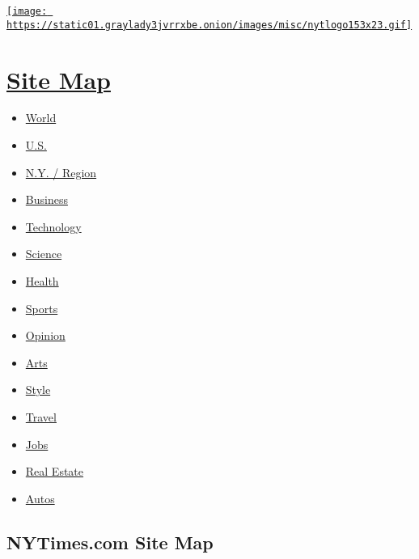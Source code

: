\href{http://www.nytimes3xbfgragh.onion}{\texttt{[image: https://static01.graylady3jvrrxbe.onion/images/misc/nytlogo153x23.gif]}}

\hypertarget{site-map}{%
\section{\texorpdfstring{\href{http://spiderbites.nytimes3xbfgragh.onion}{Site
Map}}{Site Map}}\label{site-map}}

\begin{itemize}
\tightlist
\item
  \href{http://www.nytimes3xbfgragh.onion/pages/world/index.html}{World}
\item
  \href{http://www.nytimes3xbfgragh.onion/pages/national/index.html}{U.S.}
\item
  \href{http://www.nytimes3xbfgragh.onion/pages/nyregion/index.html}{N.Y.
  / Region}
\item
  \href{http://www.nytimes3xbfgragh.onion/pages/business/index.html}{Business}
\item
  \href{http://www.nytimes3xbfgragh.onion/pages/technology/index.html}{Technology}
\item
  \href{http://www.nytimes3xbfgragh.onion/pages/science/index.html}{Science}
\item
  \href{http://www.nytimes3xbfgragh.onion/pages/health/index.html}{Health}
\item
  \href{http://www.nytimes3xbfgragh.onion/pages/sports/index.html}{Sports}
\item
  \href{http://www.nytimes3xbfgragh.onion/pages/opinion/index.html}{Opinion}
\item
  \href{http://www.nytimes3xbfgragh.onion/pages/arts/index.html}{Arts}
\item
  \href{http://www.nytimes3xbfgragh.onion/pages/style/index.html}{Style}
\item
  \href{http://travel.nytimes3xbfgragh.onion}{Travel}
\item
  \href{http://jobmarket.nytimes3xbfgragh.onion/pages/jobs/index.html}{Jobs}
\item
  \href{http://www.nytimes3xbfgragh.onion/pages/realestate/index.html}{Real
  Estate}
\item
  \href{http://www.nytimes3xbfgragh.onion/pages/automobiles/index.html}{Autos}
\end{itemize}

\hypertarget{nytimescom-site-map}{%
\subsection{NYTimes.com Site Map}\label{nytimescom-site-map}}

